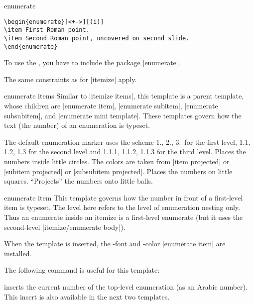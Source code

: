 \begin{environment}{{enumerate}}
\begin{verbatim}
\begin{enumerate}[<+->][(i)]
\item First Roman point.
\item Second Roman point, uncovered on second slide.
\end{enumerate}
\end{verbatim}

  \articlenote
  To use the , you have to include the package
  |enumerate|.  

  \lyxnote
  The same constraints as for |itemize| apply.
  
  \begin{element}{enumerate items}\semiyes\no\no
    Similar to |itemize items|, this template is a parent template,
    whose children are |enumerate item|, |enumerate subitem|,
    |enumerate subsubitem|, and |enumerate mini template|. These
    templates govern how the text (the number) of an enumeration is
    typeset. 
    
    \begin{templateoptions}
      The default enumeration marker uses the scheme 1., 2., 3.\ for
      the first level, 1.1, 1.2, 1.3 for the second level and 1.1.1,
      1.1.2, 1.1.3 for the third level. 
      Places the numbers inside little circles. The colors are taken
      from |item projected| or |subitem projected| or
      |subsubitem projected|.
      Places the numbers on little squares.
      ``Projects'' the numbers onto little balls.
    \end{templateoptions}
  \end{element}

  \begin{element}{enumerate item}\yes\yes\yes
    This template governs how the number in front of a first-level
    item is typeset. The level here refers to the level of enumeration
    nesting only. Thus an enumerate inside an itemize is a first-level
    enumerate (but it uses the second-level
    |itemize/enumerate body|). 

    When the template is inserted, the \beamer-font and -color
    |enumerate item| are installed.

    The following command is useful for this template:
    \begin{templateinserts}
      \iteminsert{\insertenumlabel}
      inserts the current number of the top-level enumeration (as an
      Arabic number). This insert is also available in the next two
      templates. 
    \end{templateinserts}
  \end{element}


\end{environment}

